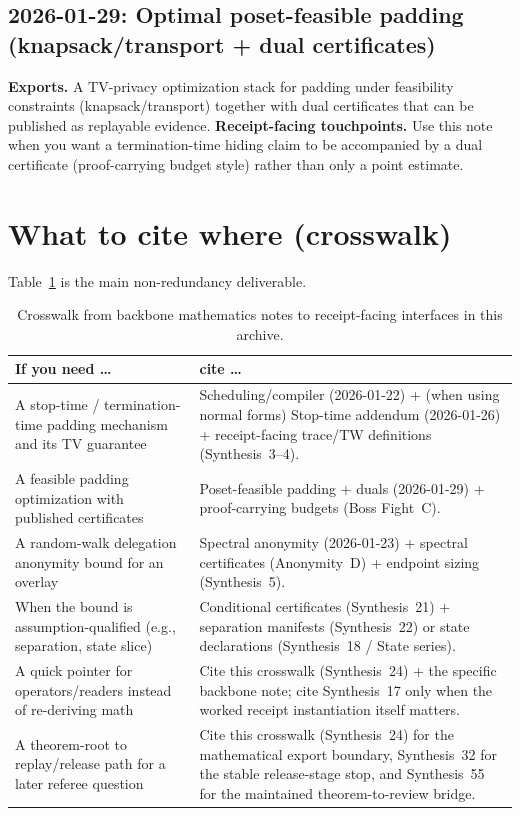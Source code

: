 \documentclass[11pt]{article}
\begin{document}
\subsection{2026-01-29: Optimal poset-feasible padding (knapsack/transport + dual certificates)}
\textbf{Exports.}
A TV-privacy optimization stack for padding under feasibility constraints (knapsack/transport) together with dual certificates that can be published as replayable evidence.
\textbf{Receipt-facing touchpoints.} Use this note when you want a termination-time hiding claim to be accompanied by a dual certificate (proof-carrying budget style) rather than only a point estimate.\cite{wiki:knapsack,series:pcbudgets}

\section{What to cite where (crosswalk)}
Table~\ref{tab:crosswalk} is the main non-redundancy deliverable.

\begin{table}[t]
\centering
\small
\begin{tabularx}{\linewidth}{@{}lX@{}}
\toprule
If you need \dots & cite \dots \\
\midrule
A stop-time / termination-time padding mechanism and its TV guarantee & Scheduling/compiler (2026-01-22) + (when using normal forms) Stop-time addendum (2026-01-26) + receipt-facing trace/TW definitions (Synthesis~3--4). \\
A feasible padding optimization with published certificates & Poset-feasible padding + duals (2026-01-29) + proof-carrying budgets (Boss Fight~C). \\
A random-walk delegation anonymity bound for an overlay & Spectral anonymity (2026-01-23) + spectral certificates (Anonymity~D) + endpoint sizing (Synthesis~5). \\
When the bound is assumption-qualified (e.g., separation, state slice) & Conditional certificates (Synthesis~21) + separation manifests (Synthesis~22) or state declarations (Synthesis~18 / State series). \\
A quick pointer for operators/readers instead of re-deriving math & Cite this crosswalk (Synthesis~24) + the specific backbone note; cite Synthesis~17 only when the worked receipt instantiation itself matters. \\
A theorem-root to replay/release path for a later referee question & Cite this crosswalk (Synthesis~24) for the mathematical export boundary, Synthesis~32 for the stable release-stage stop, and Synthesis~55 for the maintained theorem-to-review bridge. \\
\bottomrule
\end{tabularx}
\caption{Crosswalk from backbone mathematics notes to receipt-facing interfaces in this archive.}
\label{tab:crosswalk}
\end{table}
\end{document}
